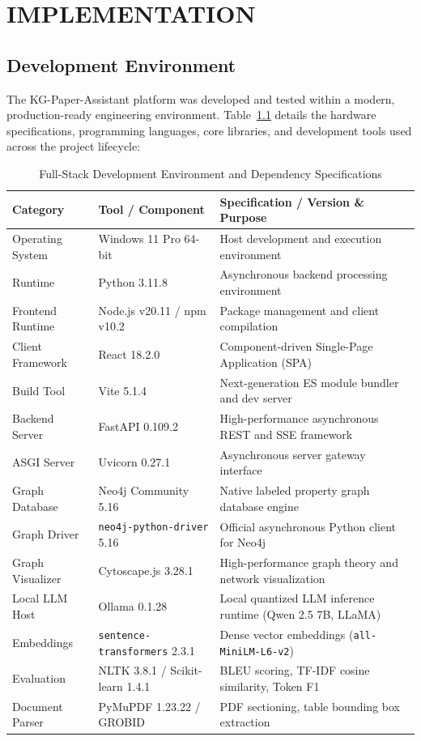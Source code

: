 \chapter{IMPLEMENTATION}

\section{Development Environment}
The KG-Paper-Assistant platform was developed and tested within a modern, production-ready engineering environment. Table~\ref{tab:dev_environment} details the hardware specifications, programming languages, core libraries, and development tools used across the project lifecycle:

\begin{table}[h]
\centering
\caption{Full-Stack Development Environment and Dependency Specifications}
\label{tab:dev_environment}
\small
\begin{tabular}{llp{7.5cm}}
\toprule
\textbf{Category} & \textbf{Tool / Component} & \textbf{Specification / Version \& Purpose} \\
\midrule
Operating System & Windows 11 Pro 64-bit & Host development and execution environment \\
Runtime & Python 3.11.8 & Asynchronous backend processing environment \\
Frontend Runtime & Node.js v20.11 / npm v10.2 & Package management and client compilation \\
Client Framework & React 18.2.0 & Component-driven Single-Page Application (SPA) \\
Build Tool & Vite 5.1.4 & Next-generation ES module bundler and dev server \\
Backend Server & FastAPI 0.109.2 & High-performance asynchronous REST and SSE framework \\
ASGI Server & Uvicorn 0.27.1 & Asynchronous server gateway interface \\
Graph Database & Neo4j Community 5.16 & Native labeled property graph database engine \\
Graph Driver & \texttt{neo4j-python-driver} 5.16 & Official asynchronous Python client for Neo4j \\
Graph Visualizer & Cytoscape.js 3.28.1 & High-performance graph theory and network visualization \\
Local LLM Host & Ollama 0.1.28 & Local quantized LLM inference runtime (Qwen 2.5 7B, LLaMA) \\
Embeddings & \texttt{sentence-transformers} 2.3.1 & Dense vector embeddings (\texttt{all-MiniLM-L6-v2}) \\
Evaluation & NLTK 3.8.1 / Scikit-learn 1.4.1 & BLEU scoring, TF-IDF cosine similarity, Token F1 \\
Document Parser & PyMuPDF 1.23.22 / GROBID & PDF sectioning, table bounding box extraction \\
\bottomrule
\end{tabular}
\end{table}

